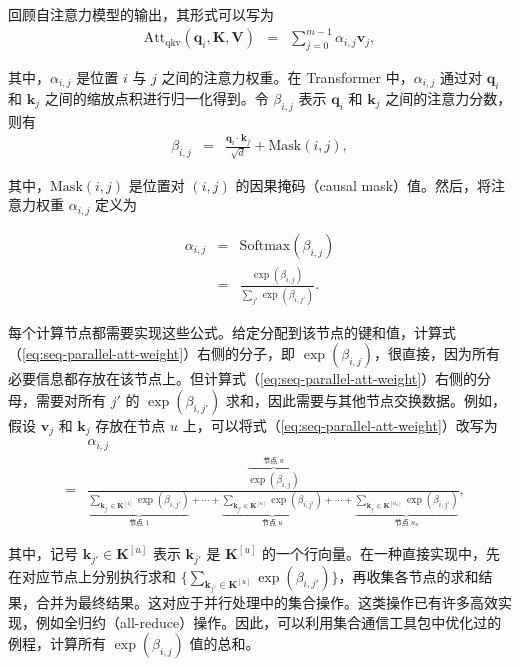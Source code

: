 回顾自注意力模型的输出，其形式可以写为
\begin{eqnarray}
\mathrm{Att}_{\mathrm{qkv}}(\mathbf{q}_i,\mathbf{K},\mathbf{V}) & = & \sum_{j=0}^{m-1} \alpha_{i,j} \mathbf{v}_j \label{eq:seq-parallel-qkv},
\end{eqnarray}

\noindent 其中，$\alpha_{i,j}$ 是位置 $i$ 与 $j$ 之间的注意力权重。在 Transformer 中，$\alpha_{i,j}$ 通过对 $\mathbf{q}_i$ 和 $\mathbf{k}_j$ 之间的缩放点积进行归一化得到。令 $\beta_{i,j}$ 表示 $\mathbf{q}_i$ 和 $\mathbf{k}_j$ 之间的注意力分数，则有
\begin{eqnarray}
\beta_{i,j} & = & \frac{\mathbf{q}_i \cdot \mathbf{k}_j}{\sqrt{d}}  + \mathrm{Mask}(i,j),
\end{eqnarray}

\noindent 其中，$\mathrm{Mask}(i,j)$ 是位置对 $(i,j)$ 的因果掩码（causal mask）值。然后，将注意力权重 $\alpha_{i,j}$ 定义为

\begin{eqnarray}
\alpha_{i,j} & = & \mathrm{Softmax}(\beta_{i,j}) \nonumber \\
             & = & \frac{\exp(\beta_{i,j})}{\sum_{j'} \exp(\beta_{i,j'})} \label{eq:seq-parallel-att-weight}.
\end{eqnarray}

每个计算节点都需要实现这些公式。给定分配到该节点的键和值，计算式（\ref{eq:seq-parallel-att-weight}）右侧的分子，即 $\exp(\beta_{i,j})$，很直接，因为所有必要信息都存放在该节点上。但计算式（\ref{eq:seq-parallel-att-weight}）右侧的分母，需要对所有 $j'$ 的 $\exp(\beta_{i,j'})$ 求和，因此需要与其他节点交换数据。例如，假设 $\mathbf{v}_j$ 和 $\mathbf{k}_j$ 存放在节点 $u$ 上，可以将式（\ref{eq:seq-parallel-att-weight}）改写为
\begin{eqnarray}
&   & \alpha_{i,j} \nonumber \\
& = & \frac{\overbrace{\exp(\beta_{i,j})}^{\textrm{节点 $u$}}}{\underbrace{\sum_{\mathbf{k}_{j'} \in \mathbf{K}^{[1]}} \exp(\beta_{i,j'}) }_{\textrm{节点 $1$}} + \cdots + \underbrace{\sum_{\mathbf{k}_{j'} \in \mathbf{K}^{[u]}} \exp(\beta_{i,j'}) }_{\textrm{节点 $u$}} + \cdots + \underbrace{\sum_{\mathbf{k}_{j'} \in \mathbf{K}^{[n_u]}} \exp(\beta_{i,j'}) }_{\textrm{节点 $n_u$}} } \label{eq:seq-parallel-att-weight-distributed},
\end{eqnarray}

\noindent 其中，记号 $\mathbf{k}_{j'} \in \mathbf{K}^{[u]}$ 表示 $\mathbf{k}_{j'}$ 是 $\mathbf{K}^{[u]}$ 的一个行向量。在一种直接实现中，先在对应节点上分别执行求和 $\{ \sum_{\mathbf{k}_{j'} \in \mathbf{K}^{[u]}} \exp(\beta_{i,j'}) \}$，再收集各节点的求和结果，合并为最终结果。这对应于并行处理中的集合操作。这类操作已有许多高效实现，例如全归约（all-reduce）操作。因此，可以利用集合通信工具包中优化过的例程，计算所有 $\exp(\beta_{i,j})$ 值的总和。


